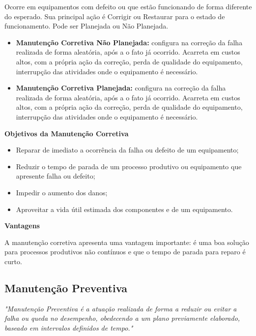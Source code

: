 		Ocorre em equipamentos com defeito ou que estão funcionando de forma diferente do esperado. Sua principal ação é Corrigir ou Restaurar para o estado de funcionamento. Pode ser Planejada ou Não Planejada.

		\begin{itemize}
			\item \textbf{Manutenção Corretiva Não Planejada:} configura na correção da falha realizada de forma aleatória, após a o fato já ocorrido. Acarreta em custos altos, com a própria ação da correção, perda de qualidade do equipamento, interrupção das atividades onde o equipamento é necessário.
			\item \textbf{Manutenção Corretiva Planejada:} configura na correção da falha realizada de forma aleatória, após a o fato já ocorrido. Acarreta em custos altos, com a própria ação da correção, perda de qualidade do equipamento, interrupção das atividades onde o equipamento é necessário.
		\end{itemize}

		\textbf{Objetivos da Manutenção Corretiva}
			\begin{itemize}
				\item Reparar de imediato a ocorrência da falha ou defeito de um equipamento;   
				\item Reduzir  o tempo de  parada de um processo produtivo ou equipamento que apresente falha ou defeito; 
				\item Impedir o aumento dos danos; 
				\item Aproveitar a vida útil estimada dos componentes e de um equipamento.
			\end{itemize}	

		\textbf{Vantagens}

		A manutenção corretiva apresenta uma vantagem importante: é uma boa solução para processos produtivos não contínuos e que o tempo de parada para reparo é curto. 


\subsection{Manutenção Preventiva}

		\emph{"Manutenção Preventiva é a atuação realizada de forma a reduzir ou evitar a falha ou queda no desempenho, obedecendo a um plano previamente elaborado, baseado em intervalos definidos de tempo."} \cite{kardecnascif2010}

